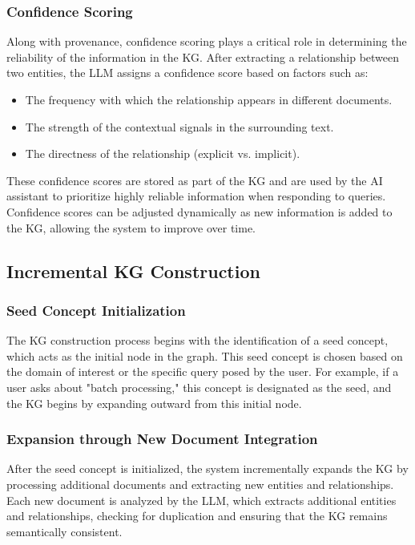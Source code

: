 \subsubsection{Confidence Scoring}

Along with provenance, confidence scoring plays a critical role in determining the reliability of the information in the KG. After extracting a relationship between two entities, the LLM assigns a confidence score based on factors such as:
\begin{itemize}
    \item The frequency with which the relationship appears in different documents.
    \item The strength of the contextual signals in the surrounding text.
    \item The directness of the relationship (explicit vs. implicit).
\end{itemize}

These confidence scores are stored as part of the KG and are used by the AI assistant to prioritize highly reliable information when responding to queries. Confidence scores can be adjusted dynamically as new information is added to the KG, allowing the system to improve over time.

\subsection{Incremental KG Construction}

\subsubsection{Seed Concept Initialization}

The KG construction process begins with the identification of a seed concept, which acts as the initial node in the graph. This seed concept is chosen based on the domain of interest or the specific query posed by the user. For example, if a user asks about "batch processing," this concept is designated as the seed, and the KG begins by expanding outward from this initial node.

\subsubsection{Expansion through New Document Integration}

After the seed concept is initialized, the system incrementally expands the KG by processing additional documents and extracting new entities and relationships. Each new document is analyzed by the LLM, which extracts additional entities and relationships, checking for duplication and ensuring that the KG remains semantically consistent.

